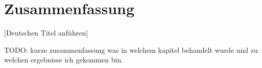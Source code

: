 \documentclass[Bachelorarbeit.tex]{subfiles}
\begin{document}
\chapter*{Zusammenfassung}
[Deutschen Titel anführen]

TODO: kurze zusammenfassung was in welchem kapitel behandelt wurde und zu welchen ergebnisse ich gekommen bin. 
\end{document}
